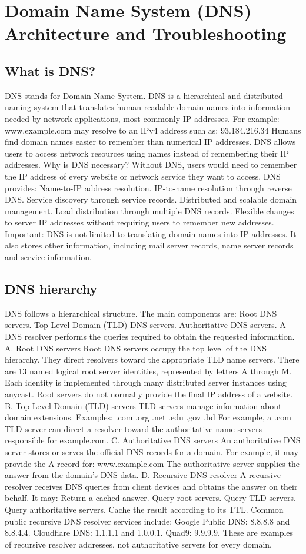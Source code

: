 \section{Domain Name System (DNS) Architecture and Troubleshooting}

\subsection{What is DNS?}
DNS stands for Domain Name System.
DNS is a hierarchical and distributed naming system that translates human-readable domain names into information needed by network applications, most commonly IP addresses.
For example:
www.example.com
may resolve to an IPv4 address such as:
93.184.216.34
Humans find domain names easier to remember than numerical IP addresses.
DNS allows users to access network resources using names instead of remembering their IP addresses.
Why is DNS necessary?
Without DNS, users would need to remember the IP address of every website or network service they want to access.
DNS provides:
Name-to-IP address resolution.
IP-to-name resolution through reverse DNS.
Service discovery through service records.
Distributed and scalable domain management.
Load distribution through multiple DNS records.
Flexible changes to server IP addresses without requiring users to remember new addresses.
Important: DNS is not limited to translating domain names into IP addresses. It also stores other information, including mail server records, name server records and service information.
\subsection{DNS hierarchy}
DNS follows a hierarchical structure.
The main components are:
Root DNS servers.
Top-Level Domain (TLD) DNS servers.
Authoritative DNS servers.
A DNS resolver performs the queries required to obtain the requested information.
A. Root DNS servers
Root DNS servers occupy the top level of the DNS hierarchy.
They direct resolvers toward the appropriate TLD name servers.
There are 13 named logical root server identities, represented by letters A through M. Each identity is implemented through many distributed server instances using anycast.
Root servers do not normally provide the final IP address of a website.
B. Top-Level Domain (TLD) servers
TLD servers manage information about domain extensions.
Examples:
.com
.org
.net
.edu
.gov
.bd
For example, a .com TLD server can direct a resolver toward the authoritative name servers responsible for example.com.
C. Authoritative DNS servers
An authoritative DNS server stores or serves the official DNS records for a domain.
For example, it may provide the A record for:
www.example.com
The authoritative server supplies the answer from the domain's DNS data.
D. Recursive DNS resolver
A recursive resolver receives DNS queries from client devices and obtains the answer on their behalf.
It may:
Return a cached answer.
Query root servers.
Query TLD servers.
Query authoritative servers.
Cache the result according to its TTL.
Common public recursive DNS resolver services include:
Google Public DNS: 8.8.8.8 and 8.8.4.4.
Cloudflare DNS: 1.1.1.1 and 1.0.0.1.
Quad9: 9.9.9.9.
These are examples of recursive resolver addresses, not authoritative servers for every domain.
